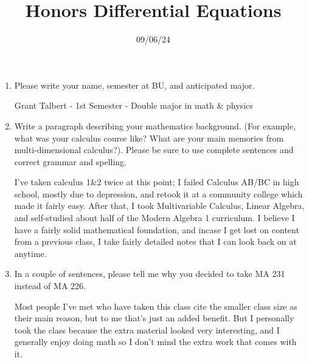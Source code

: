 \documentclass[11pt, letterpaper]{report}
\title{Honors Differential Equations}
\date{09/06/24}
\begin{document}
 \makeproblem
 \begin{enumerate}
	 \item Please write your name, semester at BU, and anticipated major.\par
	 Grant Talbert - 1st Semester - Double major in math \& physics
 	 \item Write a paragraph describing your mathematics background. (For example, what was your calculus course like? What are your main memories from multi-dimensional calculus?). Please be sure to use complete sentences and correct grammar and spelling.\par
		 I've taken calculus 1\&2 twice at this point; I failed Calculus AB/BC in high school, mostly due to depression, and retook it at a community college which made it fairly easy. After that, I took Multivariable Calculus, Linear Algebra, and self-studied about half of the Modern Algebra 1 curriculum. I believe I have a fairly solid mathematical foundation, and incase I get lost on content from a previous class, I take fairly detailed notes that I can look back on at anytime.
	 \item In a couple of sentences, please tell me why you decided to take MA 231 instead of MA 226.\par
	 Most people I've met who have taken this class cite the smaller class size as their main reason, but to me that's just an added benefit. But I personally took the class because the extra material looked very interesting, and I generally enjoy doing math so I don't mind the extra work that comes with it.
 \end{enumerate}
\end{document}
